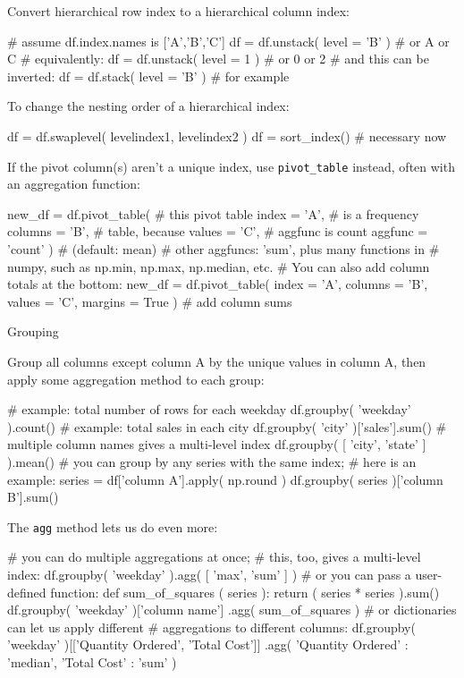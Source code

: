 \documentclass[a4paper,landscape,columns=3]{cheatsheet}
\def\sect#1{\begin{tcolorbox}[colback=blue!5!white,colframe=blue!75!black,size=title,leftrule=2mm]
    \large #1
\end{tcolorbox}}
\begin{document}
Convert hierarchical row index to a hierarchical column index:
\begin{python}
# assume df.index.names is ['A','B','C']
df = df.unstack( level = 'B' )  # or A or C
# equivalently:
df = df.unstack( level = 1 )    # or 0 or 2
# and this can be inverted:
df = df.stack( level = 'B' )    # for example
\end{python}

To change the nesting order of a hierarchical index:
\begin{python}
df = df.swaplevel( levelindex1, levelindex2 )
df = sort_index()               # necessary now
\end{python}

If the pivot column(s) aren't a unique index, use \lstinline{pivot_table} instead, often with an aggregation function:
\begin{python}
new_df = df.pivot_table(        # this pivot table
    index   = 'A',              # is a frequency
    columns = 'B',              # table, because
    values  = 'C',              # aggfunc is count
    aggfunc = 'count' )         # (default: mean)
# other aggfuncs: 'sum', plus many functions in
# numpy, such as np.min, np.max, np.median, etc.
# You can also add column totals at the bottom:
new_df = df.pivot_table(
    index   = 'A',
    columns = 'B',
    values  = 'C',
    margins = True )            # add column sums
\end{python}

\sect{Grouping}

Group all columns except column A by the unique values in column A, then apply some aggregation method to each group:
\begin{python}
# example: total number of rows for each weekday
df.groupby( 'weekday' ).count()
# example: total sales in each city
df.groupby( 'city' )['sales'].sum()
# multiple column names gives a multi-level index
df.groupby( [ 'city', 'state' ] ).mean()
# you can group by any series with the same index;
# here is an example:
series = df['column A'].apply( np.round )
df.groupby( series )['column B'].sum()
\end{python}

The \lstinline{agg} method lets us do even more:
\begin{python}
# you can do multiple aggregations at once;
# this, too, gives a multi-level index:
df.groupby( 'weekday' ).agg( [ 'max', 'sum' ] )
# or you can pass a user-defined function:
def sum_of_squares ( series ):
    return ( series * series ).sum()
df.groupby( 'weekday' )['column name']
  .agg( sum_of_squares )
# or dictionaries can let us apply different
# aggregations to different columns:
df.groupby( 'weekday' )[['Quantity Ordered',
                         'Total Cost']]
  .agg( { 'Quantity Ordered' : 'median',
          'Total Cost'       : 'sum' } )
\end{python}
\end{document}
